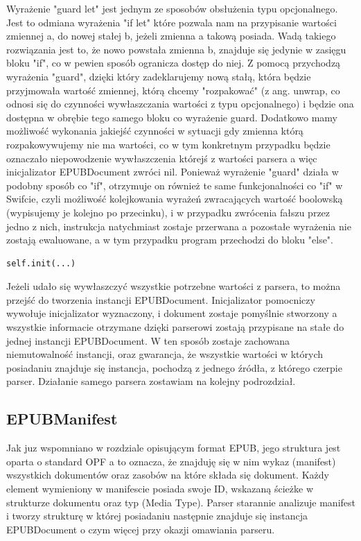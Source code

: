 Wyrażenie "guard let" jest jednym ze sposobów obsłużenia typu opcjonalnego. Jest to odmiana wyrażenia "if let" które pozwala nam na przypisanie wartości zmiennej a, do nowej stałej b, jeżeli zmienna a takową posiada. Wadą takiego rozwiązania jest to, że nowo powstała zmienna b, znajduje się jedynie w zasięgu bloku "if", co w pewien sposób ogranicza dostęp do niej. Z pomocą przychodzą wyrażenia "guard", dzięki który zadeklarujemy nową stałą, która będzie przyjmowała wartość zmiennej, którą chcemy "rozpakować" (z ang. unwrap, co odnosi się do czynności wywłaszczania wartości z typu opcjonalnego) i będzie ona dostępna w obrębie tego samego bloku co wyrażenie guard. Dodatkowo mamy możliwość wykonania jakiejść czynności w sytuacji gdy zmienna którą rozpakowywujemy nie ma wartości, co w tym konkretnym przypadku będzie oznaczało niepowodzenie wywłaszczenia którejś z wartości parsera a więc inicjalizator EPUBDocument zwróci nil. Ponieważ wyrażenie "guard" działa w podobny sposób co "if", otrzymuje on również te same funkcjonalności co "if" w Swifcie, czyli możliwość kolejkowania wyrażeń zwracających wartość boolowską (wypisujemy je kolejno po przecinku), i w przypadku zwrócenia fałszu przez jedno z nich, instrukcja natychmiast zostaje przerwana a pozostałe wyrażenia nie zostają ewaluowane, a w tym przypadku program przechodzi do bloku "else".

\begin{lstlisting}[language=swift-reference]
    self.init(...)
\end{lstlisting}

Jeżeli udało się wywłaszczyć wszystkie potrzebne wartości z parsera, to można przejść do tworzenia instancji EPUBDocument. Inicjalizator pomocniczy wywołuje inicjalizator wyznaczony, i dokument zostaje pomyślnie stworzony a wszystkie informacie otrzymane dzięki parserowi zostają przypisane na stałe do jednej instancji EPUBDocument. W ten sposób zostaje zachowana niemutowalność instancji, oraz gwarancja, że wszystkie wartości w których posiadaniu znajduje się instancja, pochodzą z jednego źródła, z którego czerpie parser. Działanie samego parsera zostawiam na kolejny podrozdział.

\subsection{EPUBManifest}

Jak juz wspomniano w rozdziale opisującym format EPUB, jego struktura jest oparta o standard OPF a to oznacza, że znajduję się w nim wykaz (manifest) wszystkich dokumentów oraz zasobów na które składa się dokument. Każdy element wymieniony w manifescie posiada swoje ID, wskazaną ścieżke w strukturze dokumentu oraz typ (Media Type). Parser starannie analizuje manifest i tworzy strukturę w której posiadaniu następnie znajduje się instancja EPUBDocument o czym więcej przy okazji omawiania parseru.

